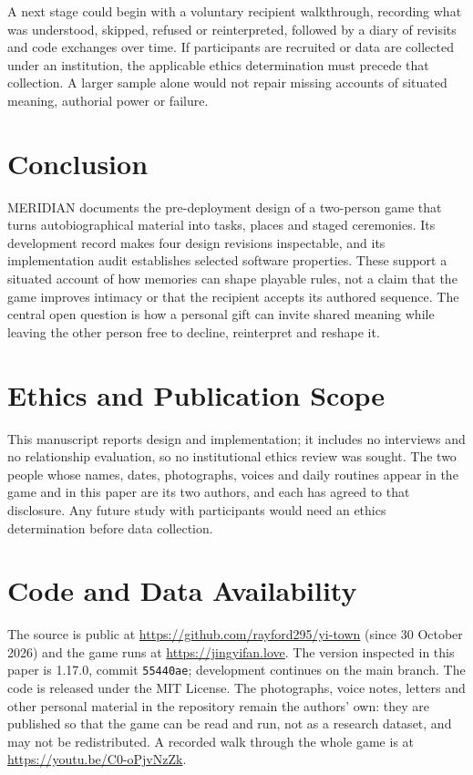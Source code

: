 \documentclass[sigconf,nonacm]{acmart}
\newcommand{\code}[1]{\textnormal{\texttt{\small #1}}}
\begin{document}
A next stage could begin with a voluntary recipient walkthrough, recording what was understood,
skipped, refused or reinterpreted, followed by a diary of revisits and code exchanges over time.
If participants are recruited or data are collected
under an institution, the applicable ethics determination must precede that collection. A larger
sample alone would not repair missing accounts of situated meaning, authorial power or failure.



\section{Conclusion}
MERIDIAN documents the pre-deployment design of a two-person game that turns autobiographical
material into tasks, places and staged ceremonies. Its development record makes four design
revisions inspectable, and its implementation audit establishes selected software properties.
These support a situated account of how memories can shape playable rules, not a claim that the
game improves intimacy or that the recipient accepts its authored sequence. The central
open question is how a personal gift can invite shared meaning while leaving the other person
free to decline, reinterpret and reshape it.

\section*{Ethics and Publication Scope}
This manuscript reports design and implementation; it includes no interviews and no relationship
evaluation, so no institutional ethics review was sought. The two people whose names, dates,
photographs, voices and daily routines appear in the game and in this paper are its two authors,
and each has agreed to that disclosure. Any future study with participants would need an ethics
determination before data collection.

\section*{Code and Data Availability}
The source is public at \url{https://github.com/rayford295/yi-town} (since 30 October 2026) and
the game runs at \url{https://jingyifan.love}. The version inspected in this paper is 1.17.0,
commit \code{55440ae}; development continues on the main branch. The code is released under the
MIT License. The photographs, voice notes, letters and other personal material in the repository
remain the authors' own: they are published so that the game can be read and run, not as a
research dataset, and may not be redistributed. A recorded walk through the whole game is at
\url{https://youtu.be/C0-oPjvNzZk}.
\end{document}
